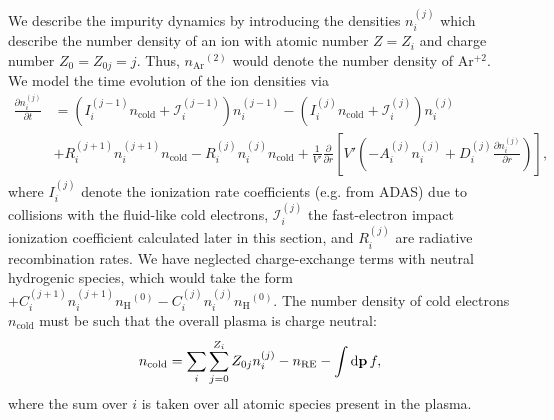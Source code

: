 \documentclass[11pt,a4paper]{article}
\newcommand{\rd}{\ensuremath{\mathrm{d}}}
\newcommand{\sub}[1]{\ensuremath{_{\text{#1}}}}
\renewcommand{\b}[1]{\ensuremath{ {\bf #1 } }}
\begin{document}
We describe the impurity dynamics by introducing the densities $n_i^{(j)}$ which describe the number density of an ion with atomic number $Z = Z_i$ and charge number $Z_0 = Z_{0j} = j$. Thus, $n\sub{Ar}^{(2)}$ would denote the number density of Ar$^{+2}$. We model the time evolution of the ion densities via
\begin{align}
\frac{\partial n_i^{(j)}}{\partial t} &=\left( I_{i}^{(j-1)}n\sub{cold}+\mathcal{I}_i^{(j-1)}\right)n_i^{(j-1)} - \left(I_i^{(j)}n\sub{cold} + \mathcal{I}_i^{(j)}\right)n_i^{(j)}  \nonumber \\
&+ R_i^{(j+1)} n_i^{(j+1)}n\sub{cold} - R_i^{(j)}n_i^{(j)}n\sub{cold}+ \frac{1}{V'}\frac{\partial}{\partial r}\left[V'\left(-A_i^{(j)}n_i^{(j)}+D_i^{(j)}\frac{\partial n_i^{(j)}}{\partial r}\right)\right],
\end{align} 
where $I_i^{(j)}$ denote the ionization rate coefficients (e.g. from ADAS) due to collisions with the fluid-like cold electrons, $\mathcal{I}_i^{(j)}$ the fast-electron impact ionization coefficient calculated later in this section, and $R_i^{(j)}$ are radiative recombination rates.
We have neglected charge-exchange terms with neutral hydrogenic species, which would take the form $+C_{i}^{(j+1)}n_i^{(j+1)}n\sub{H}^{(0)} - C_{i}^{(j)}n_i^{(j)}n\sub{H}^{(0)} $.
The number density of cold electrons $n\sub{cold}$ must be such that the overall plasma is charge neutral:
\begin{align}
n\sub{cold} = \sum_i \sum_{j=0}^{Z_i} Z_{0j} n_i^{(j)} - n\sub{RE} - \int \rd \b{p} \, f,
\end{align}
where the sum over $i$ is taken over all atomic species present in the plasma.  
\end{document}
